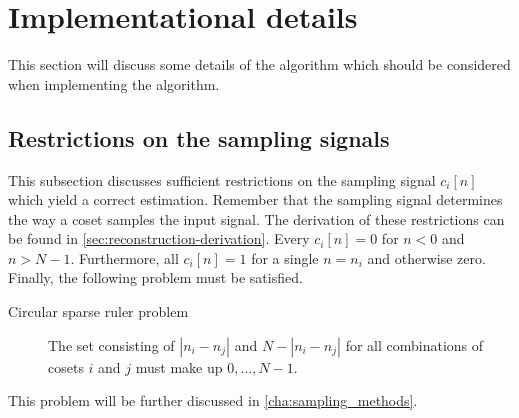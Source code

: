 \documentclass[a4paper, openany, oneside]{memoir}
\begin{document}
\section{Implementational details}
\label{sec:reconstruction-implementation}
This section will discuss some details of the algorithm which should be considered when implementing the algorithm.

\subsection{Restrictions on the sampling signals}
\label{sub:reconstruction-ci}
This subsection discusses sufficient restrictions on the sampling signal $c_i[n]$ which yield a correct estimation. Remember that the sampling signal determines the way a coset samples the input signal. The derivation of these restrictions can be found in \cref{sec:reconstruction-derivation}. Every $c_i[n]=0$ for $n < 0$ and $n > N-1$. Furthermore, all $c_i[n]=1$ for a single $n=n_i$ and otherwise zero. Finally, the following problem must be satisfied.

\begin{description}
    \item[Circular sparse ruler problem] The set consisting of $|n_i - n_j|$ and $N-|n_i-n_j|$ for all combinations of cosets $i$ and $j$ must make up $0,\ldots,N-1$.
\end{description}

This problem will be further discussed in \cref{cha:sampling_methods}.
\end{document}
